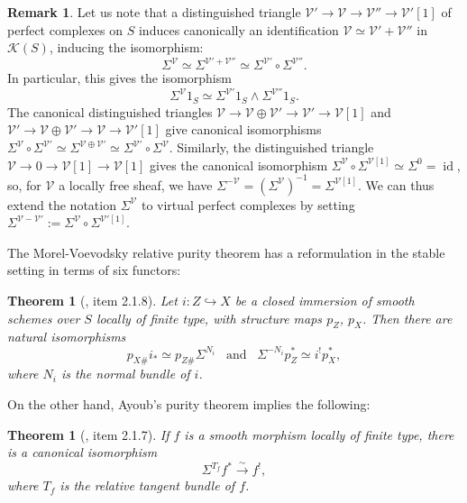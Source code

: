 \documentclass[10pt]{amsart}
\theoremstyle{definition}
\newtheorem{rmk}[defn]{Remark}
\theoremstyle{plain}
\newtheorem{thm}[defn]{Theorem}
\numberwithin{equation}{section}
\newcommand{\0}{\emptyset}
\newcommand{\sK}{{\mathcal K}}
\newcommand{\sV}{{\mathcal V}}
\newcommand{\id}{{\operatorname{id}}}
\begin{document}
\begin{rmk}
    Let us note that a distinguished triangle $\sV' \to \sV \to \sV''\to \sV'[1]$ of perfect complexes on $S$ induces canonically an identification $\sV \simeq \sV' + \sV''$ in $\sK(S)$, inducing the isomorphism:
$$\Sigma^\sV \simeq \Sigma^{\sV' +\sV''} \simeq \Sigma^{\sV'}\circ \Sigma^{\sV''}.$$
In particular, this gives the isomorphism
\begin{equation}
\label{eq:smash-stablethom}
    \Sigma^\sV 1_S \simeq \Sigma^{\sV'}1_S \wedge \Sigma^{\sV''}1_S.
\end{equation}
The canonical distinguished triangles $\sV\to \sV\oplus\sV'\to \sV'\to \sV[1]$ and $\sV'\to \sV\oplus\sV'\to \sV\to \sV'[1]$ give canonical isomorphisms $\Sigma^\sV\circ\Sigma^{\sV'}\simeq \Sigma^{\sV\oplus \sV'}\simeq \Sigma^{\sV'}\circ \Sigma^\sV$. Similarly, the distinguished triangle $\sV\to 0\to \sV[1]\to \sV[1]$ gives the canonical isomorphism $\Sigma^{\sV}\circ \Sigma^{\sV[1]}\simeq\Sigma^0=\id$, so, for $\sV$ a locally free sheaf, we have $\Sigma^{-\sV}=(\Sigma^{\sV})^{-1}=\Sigma^{\sV[1]}$. We can thus extend the notation $\Sigma^\sV$ to virtual perfect complexes by setting $\Sigma^{\sV-\sV'}:=\Sigma^{\sV}\circ\Sigma^{\sV'[1]}$.
\end{rmk}

The Morel-Voevodsky relative purity theorem \cite[\S 3 Theorem 2.23]{morvoe:homotopytheory} has a reformulation in the stable setting in terms of six functors:

\begin{thm}[\cite{deglise-jin-khan}, item 2.1.8]
\label{thm:MorVoePurity}
    Let $i:Z \hookrightarrow X$ be a closed immersion of smooth schemes over $S$ locally of finite type, with structure maps $p_Z$, $p_X$. Then there are natural isomorphisms
    $$p_{X\#}i_* \simeq p_{Z\#}\Sigma^{N_i} \; \; \; \text{and} \; \; \; \Sigma^{-N_i}p_Z^* \simeq i^!p_X^*,$$
    where $N_i$ is the normal bundle of $i$.
\end{thm}

On the other hand, Ayoub's purity theorem \cite[Section 1.6]{ayoub:sixfunctors} implies the following:

\begin{thm}[\cite{deglise-jin-khan}, item 2.1.7]
\label{thm:ayoubpurity}
    If $f$ is a smooth morphism locally of finite type, there is a canonical isomorphism
    \begin{equation}
    \label{eq:AyoubPurity}
        \Sigma^{T_f}f^* \xrightarrow{\sim} f^!,
    \end{equation}
    where $T_f$ is the relative tangent bundle of $f$.
\end{thm}
\end{document}
